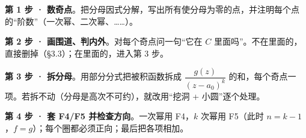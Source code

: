 \documentclass[11pt]{ctexart}
\let\origsubhdr\subhdr
\renewcommand{\subhdr}[1]{\par\needspace{4\baselineskip}\origsubhdr{#1}}
\let\orighdr\hdr
\renewcommand{\hdr}[2]{\par\needspace{9\baselineskip}\orighdr{#1}{#2}}
\begin{document}

\textbf{第 1 步 · 数奇点}。把分母因式分解，写出所有使分母为零的点，并注明每个点的“阶数”（一次幂、二次幂、……）。

\textbf{第 2 步 · 画围道、判内外}。对每个奇点问一句“它在 $C$ 里面吗”。不在里面的，直接删掉（§3.3）；在里面的，进入第 3 步。

\textbf{第 3 步 · 拆分母}。用部分分式把被积函数拆成 $\dfrac{g(z)}{(z-a_0)^{k}}$ 的和，每个奇点一项。若拆不动（分母是高次不可约），就改用“挖洞 + 小圆”逐个处理。

\textbf{第 4 步 · 套 F4/F5 并检查方向}。一次幂用 F4，$k$ 次幂用 F5（此时 $n=k-1$，$f=g$）；每个圈都必须正向；最后把各项相加。


\flowerrule

\end{document}
